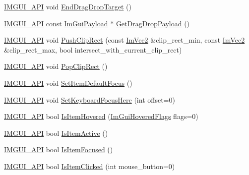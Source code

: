 \begin{DoxyCompactItemize}
\item 
\mbox{\hyperlink{imgui_8h_a43829975e84e45d1149597467a14bbf5}{I\+M\+G\+U\+I\+\_\+\+A\+PI}} void \mbox{\hyperlink{namespace_im_gui_ae8313266214728f86c2cb7cb30a30e89}{End\+Drag\+Drop\+Target}} ()
\item 
\mbox{\hyperlink{imgui_8h_a43829975e84e45d1149597467a14bbf5}{I\+M\+G\+U\+I\+\_\+\+A\+PI}} const \mbox{\hyperlink{struct_im_gui_payload}{Im\+Gui\+Payload}} $\ast$ \mbox{\hyperlink{namespace_im_gui_a1756b37d61154de489f1520179b4e294}{Get\+Drag\+Drop\+Payload}} ()
\item 
\mbox{\hyperlink{imgui_8h_a43829975e84e45d1149597467a14bbf5}{I\+M\+G\+U\+I\+\_\+\+A\+PI}} void \mbox{\hyperlink{namespace_im_gui_a11c8bd8676e1281e15b24c9615b6904a}{Push\+Clip\+Rect}} (const \mbox{\hyperlink{struct_im_vec2}{Im\+Vec2}} \&clip\+\_\+rect\+\_\+min, const \mbox{\hyperlink{struct_im_vec2}{Im\+Vec2}} \&clip\+\_\+rect\+\_\+max, bool intersect\+\_\+with\+\_\+current\+\_\+clip\+\_\+rect)
\item 
\mbox{\hyperlink{imgui_8h_a43829975e84e45d1149597467a14bbf5}{I\+M\+G\+U\+I\+\_\+\+A\+PI}} void \mbox{\hyperlink{namespace_im_gui_aef1c8a6e5a3c70cb10d03d2a2a66dfd8}{Pop\+Clip\+Rect}} ()
\item 
\mbox{\hyperlink{imgui_8h_a43829975e84e45d1149597467a14bbf5}{I\+M\+G\+U\+I\+\_\+\+A\+PI}} void \mbox{\hyperlink{namespace_im_gui_a3720a69496e9b8cf110a11dfe7d334e6}{Set\+Item\+Default\+Focus}} ()
\item 
\mbox{\hyperlink{imgui_8h_a43829975e84e45d1149597467a14bbf5}{I\+M\+G\+U\+I\+\_\+\+A\+PI}} void \mbox{\hyperlink{namespace_im_gui_ae85e5fba7e88cea8bd3ba5b687c979f2}{Set\+Keyboard\+Focus\+Here}} (int offset=0)
\item 
\mbox{\hyperlink{imgui_8h_a43829975e84e45d1149597467a14bbf5}{I\+M\+G\+U\+I\+\_\+\+A\+PI}} bool \mbox{\hyperlink{namespace_im_gui_ac9a400eff3a9561d95e80486c52a660b}{Is\+Item\+Hovered}} (\mbox{\hyperlink{imgui_8h_a3a8f688665e5ea0bd9700e1251580a2c}{Im\+Gui\+Hovered\+Flags}} flags=0)
\item 
\mbox{\hyperlink{imgui_8h_a43829975e84e45d1149597467a14bbf5}{I\+M\+G\+U\+I\+\_\+\+A\+PI}} bool \mbox{\hyperlink{namespace_im_gui_a2d8ac4569456a8003e4dddd39caf771c}{Is\+Item\+Active}} ()
\item 
\mbox{\hyperlink{imgui_8h_a43829975e84e45d1149597467a14bbf5}{I\+M\+G\+U\+I\+\_\+\+A\+PI}} bool \mbox{\hyperlink{namespace_im_gui_add3290865a67327258c3a32b695adb28}{Is\+Item\+Focused}} ()
\item 
\mbox{\hyperlink{imgui_8h_a43829975e84e45d1149597467a14bbf5}{I\+M\+G\+U\+I\+\_\+\+A\+PI}} bool \mbox{\hyperlink{namespace_im_gui_a0b5780dbd580e28f5d31f39da80b0b01}{Is\+Item\+Clicked}} (int mouse\+\_\+button=0)

\end{DoxyCompactItemize}
